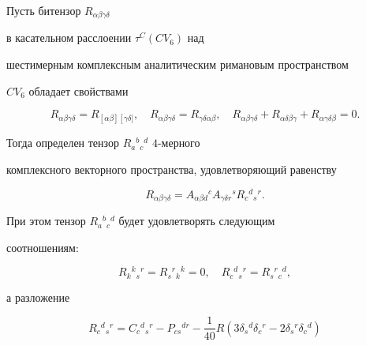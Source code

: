 \begin{thm}


\label{theorem5}


Пусть битензор $R_{\alpha \beta \gamma \delta}$


в касательном расслоении $\tau^C(CV_6)$ над


шестимерным комплексным аналитическим римановым пространством


$CV_6$ обладает свойствами


\begin{equation}


\label{e41} %


R_{\alpha \beta \gamma \delta}=R_{\left[ \alpha \beta \right]


\left[\gamma \delta] \right.},\quad


R_{\alpha \beta \gamma \delta}=R_{\gamma \delta \alpha \beta},\quad


R_{\alpha \beta \gamma \delta}+R_{\alpha \delta \beta \gamma}+


R_{\alpha \gamma \delta \beta}=0.


\end{equation}


Тогда определен тензор $R_a{}^b{}_c{}^d$\; $4$-мерного 


комплексного векторного пространства, удовлетворяющий равенству


$$


\label{e42}


R_{\alpha \beta \gamma \delta}= A_{\alpha \beta d}{}^c


A_{\gamma \delta r}{}^sR_c{}^d{}_s{}^r.


$$


При этом тензор $R_a{}^b{}_c{}^d$ будет удовлетворять следующим


соотношениям:


$$


\label{e43}


R_k{}^k{}_s{}^r=R_s{}^r{}_k{}^k=0,\quad R_c{}^d{}_s{}^r=


R_s{}^r{}_c{}^d,


$$


а разложение


\begin{equation}


\label{e44} %


R_c{}^d{}_s{}^r=C_c{}^d{}_s{}^r-P_{cs}{}^{dr}-\frac{1}{40}


R(3\delta_s{}^d \delta_c{}^r-2\delta_s{}^r \delta_c{}^d)



\end{equation}
\end{thm}
